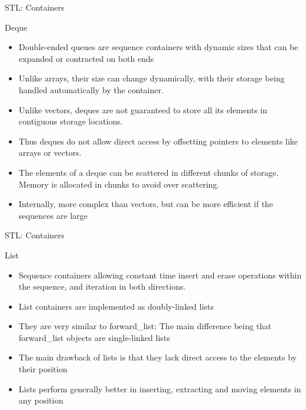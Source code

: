 \documentclass{beamer}
\begin{document}
\begin{frame}[fragile]{STL: Containers}
  \begin{block}{Deque}
    \begin{itemize}
    \item Double-ended queues are sequence containers with dynamic sizes that can be expanded or contracted on both ends\pause
    \item Unlike arrays, their size can change dynamically, with their storage being handled automatically by the container.\pause
    \item Unlike vectors, deques are not guaranteed to store all its elements in contiguous storage locations.\pause
    \item Thus deques do not allow direct access by offsetting pointers to elements like arrays or vectors.\pause
    \item The elements of a deque can be scattered in different chunks of storage. Memory is allocated in chunks to avoid over scattering.\pause
    \item Internally, more complex than vectors, but can be more efficient if the sequences are large
    \end{itemize}
  \end{block}
\end{frame}

\begin{frame}[fragile]{STL: Containers}
  \begin{block}{List}
    \begin{itemize}
    \item Sequence containers allowing constant time insert and erase operations within the sequence, and iteration in both directions.\pause
    \item List containers are implemented as doubly-linked lists\pause
    \item They are very similar to forward\_list: The main difference being that forward\_list objects are single-linked lists\pause
    \item The main drawback of lists is that they lack direct access to the elements by their position\pause
    \item Lists perform generally better in inserting, extracting and moving elements in any position
    \end{itemize}
  \end{block}
\end{frame}
\end{document}
